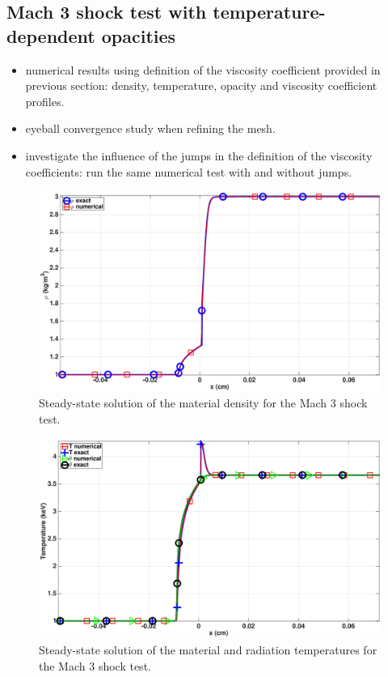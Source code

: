 \documentclass[times,doublespace]{fldauth}%
\begin{document}
\subsection{Mach 3 shock test with temperature-dependent opacities}
%
\begin{itemize}
\item numerical results using definition of the viscosity coefficient provided in previous section: density, temperature, opacity and viscosity coefficient profiles.
\item eyeball convergence study when refining the mesh.
\item investigate the influence of the jumps in the definition of the viscosity coefficients: run the same numerical test with and without jumps.
\end{itemize}
%
\begin{figure}[H]
    \centering
    \includegraphics[width=\textwidth]{figures/dpt-xs/mach_3_nel_1000_density.eps}
    \caption{Steady-state solution of the material density for the Mach 3 shock test.}\label{fig:mach-3-dpt-xs-dens}
\end{figure}
%
\begin{figure}[H]
    \centering
    \includegraphics[width=\textwidth]{figures/dpt-xs/mach_3_nel_1000_temperature.eps}
    \caption{Steady-state solution of the material and radiation temperatures for the Mach 3 shock test.}\label{fig:mach-3-dpt-xs-temp}
\end{figure}
\end{document}
